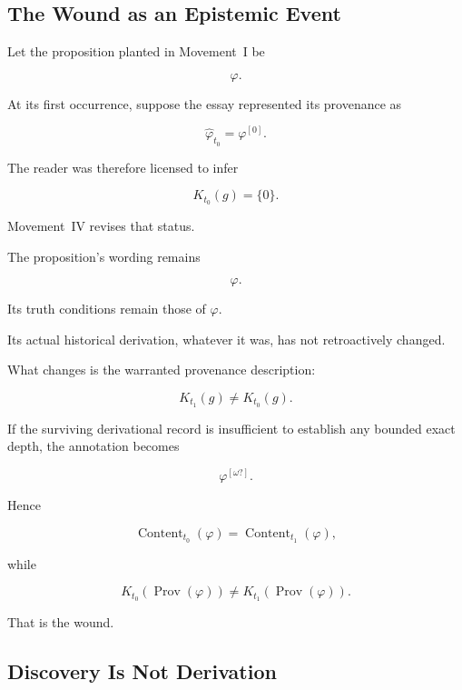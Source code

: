 \documentclass[
  11pt,
  a4paper,
  DIV=12,
  BCOR=0mm,
  parskip=half-
]{scrartcl}
\newcommand{\Prov}{\operatorname{Prov}}
\newcommand{\Content}{\operatorname{Content}}
\theoremstyle{definition}
\theoremstyle{plain}
\theoremstyle{remark}
\begin{document}

\subsection{The Wound as an Epistemic Event}
\label{app:planted-wound}

Let the proposition planted in Movement~I be

\[
  \varphi.
\]

At its first occurrence, suppose the essay represented its provenance as

\[
  \widehat\varphi_{t_0}
  =
  \varphi^{[0]}.
\]

The reader was therefore licensed to infer

\[
  K_{t_0}(g)=\{0\}.
\]

Movement~IV revises that status.

The proposition's wording remains

\[
  \varphi.
\]

Its truth conditions remain those of \(\varphi\).

Its actual historical derivation, whatever it was, has not retroactively
changed.

What changes is the warranted provenance description:

\[
  K_{t_1}(g)
  \neq
  K_{t_0}(g).
\]

If the surviving derivational record is insufficient to establish any bounded
exact depth, the annotation becomes

\[
  \varphi^{[\omega?]}.
\]

Hence

\[
  \Content_{t_0}(\varphi)
  =
  \Content_{t_1}(\varphi),
\]

while

\[
  K_{t_0}(\Prov(\varphi))
  \neq
  K_{t_1}(\Prov(\varphi)).
\]

That is the wound.


\subsection{Discovery Is Not Derivation}
\label{app:discovery-not-derivation}
\end{document}
